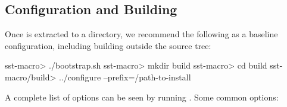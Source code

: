 \subsection{Configuration and Building}
\label{subsec:build:configure}

Once \sstmacro is extracted to a directory, we recommend the following as a baseline configuration, including building outside the source tree:

\begin{ShellCmd}
sst-macro> ./bootstrap.sh
sst-macro> mkdir build
sst-macro> cd build
sst-macro/build> ../configure --prefix=/path-to-install 
\end{ShellCmd}


A complete list of options can be seen by running .   Some common options:

